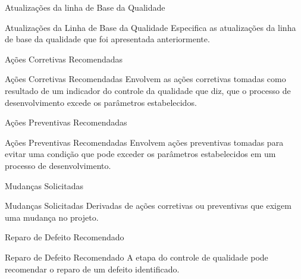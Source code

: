 \documentclass[xcolor=x11names,compress]{beamer}
\begin{document}
\begin{frame}{Atualizações da linha de Base da Qualidade}

\begin{alertblock}{Atualizações da Linha de Base da Qualidade}
Especifica as atualizações da linha de base da qualidade que foi apresentada anteriormente.
\end{alertblock}

\end{frame}

\begin{frame}{Ações Corretivas Recomendadas}

\begin{alertblock}{Ações Corretivas Recomendadas}
Envolvem as ações corretivas tomadas como resultado de um indicador do controle da qualidade que diz, que o processo de desenvolvimento excede os parâmetros estabelecidos.
\end{alertblock}

\end{frame}

\begin{frame}{Ações Preventivas Recomendadas}

\begin{alertblock}{Ações Preventivas Recomendadas}
Envolvem ações preventivas tomadas para evitar uma condição que pode exceder os parâmetros estabelecidos em um processo de desenvolvimento.
\end{alertblock}

\end{frame}

\begin{frame}{Mudanças Solicitadas}

\begin{alertblock}{Mudanças Solicitadas}
Derivadas de ações corretivas ou preventivas que exigem uma mudança no projeto. 
\end{alertblock}

\end{frame}

\begin{frame}{Reparo de Defeito Recomendado}

\begin{alertblock}{Reparo de Defeito Recomendado}
A etapa do controle de qualidade pode recomendar o reparo de um defeito identificado.
\end{alertblock}

\end{frame}
\end{document}
